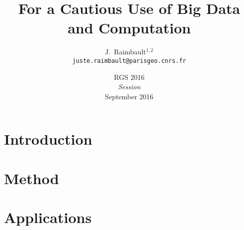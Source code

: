 \documentclass[french,11pt]{beamer}
\begin{document}
\title{For a Cautious Use of Big Data and Computation}

\author{J.~Raimbault$^{1,2}$\\
\texttt{juste.raimbault@parisgeo.cnrs.fr}
}




\date{RGS 2016\\\smallskip
\textit{Session}\\\smallskip
September 2016
}

\frame{\maketitle}
















\section{Introduction}



\section{Method}



\section{Applications}
\end{document}
